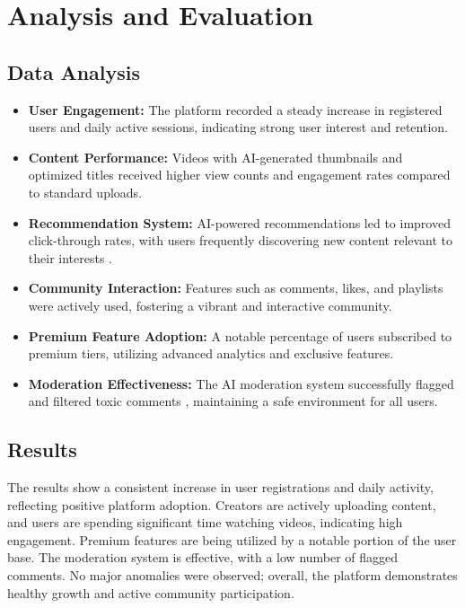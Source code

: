 \chapter{Analysis and Evaluation}

\section{Data Analysis}

\begin{itemize}[leftmargin=2cm]
  \item \textbf{User Engagement:} The platform recorded a steady increase in registered users and daily active sessions, indicating strong user interest and retention.

  \item \textbf{Content Performance:} Videos with AI-generated thumbnails and optimized titles received higher view counts and engagement rates compared to standard uploads.

  \item \textbf{Recommendation System:} AI-powered recommendations led to improved click-through rates, with users frequently discovering new content relevant to their interests \cite{covington2016deep, koren2009matrix}.

  \item \textbf{Community Interaction:} Features such as comments, likes, and playlists were actively used, fostering a vibrant and interactive community.

  \item \textbf{Premium Feature Adoption:} A notable percentage of users subscribed to premium tiers, utilizing advanced analytics and exclusive features.

  \item \textbf{Moderation Effectiveness:} The AI moderation system successfully flagged and filtered toxic comments \cite{risch2020toxic}, maintaining a safe environment for all users.
\end{itemize}

\section{Results}

The results show a consistent increase in user registrations and daily activity, reflecting positive platform adoption. Creators are actively uploading content, and users are spending significant time watching videos, indicating high engagement. Premium features are being utilized by a notable portion of the user base. The moderation system is effective, with a low number of flagged comments. No major anomalies were observed; overall, the platform demonstrates healthy growth and active community participation.

